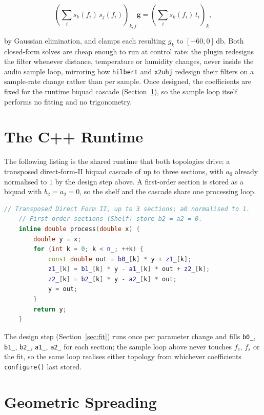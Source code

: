 \documentclass[11pt,a4paper]{article}
\begin{document}
\begin{equation}
\left(\sum_i s_k(f_i)\,s_j(f_i)\right)_{\!k,j} \mathbf{g} = \left(\sum_i s_k(f_i)\,t_i\right)_{\!k} ,
\end{equation}

by Gaussian elimination, and clamps each resulting $g_k$ to $[-60,0]\,\si{\decibel}$.
Both closed-form solves are cheap enough to run at control rate: the plugin redesigns the filter whenever distance, temperature or humidity changes, never inside the audio sample loop, mirroring how \texttt{hilbert} and \texttt{x2uhj} redesign their filters on a sample-rate change rather than per sample.
Once designed, the coefficients are fixed for the runtime biquad cascade (Section~\ref{sec:cpp}), so the sample loop itself performs no fitting and no trigonometry.

\section{The C++ Runtime}
\label{sec:cpp}

The following listing is the shared runtime that both topologies drive: a transposed direct-form-II biquad cascade of up to three sections, with $a_0$ already normalised to $1$ by the design step above.
A first-order section is stored as a biquad with $b_2 = a_2 = 0$, so the shelf and the cascade share one processing loop.

\begin{lstlisting}[language=C++,basicstyle=\small\ttfamily,frame=single]
    // Transposed Direct Form II, up to 3 sections; a0 normalised to 1.
    // First-order sections (Shelf) store b2 = a2 = 0.
    inline double process(double x) {
        double y = x;
        for (int k = 0; k < n_; ++k) {
            const double out = b0_[k] * y + z1_[k];
            z1_[k] = b1_[k] * y - a1_[k] * out + z2_[k];
            z2_[k] = b2_[k] * y - a2_[k] * out;
            y = out;
        }
        return y;
    }
\end{lstlisting}

The design step (Section~\ref{sec:fit}) runs once per parameter change and fills \texttt{b0\_}, \texttt{b1\_}, \texttt{b2\_}, \texttt{a1\_}, \texttt{a2\_} for each section; the sample loop above never touches $f_c$, $f_s$ or the fit, so the same loop realises either topology from whichever coefficients \texttt{configure()} last stored.

\section{Geometric Spreading}
\label{sec:spreading}
\end{document}
